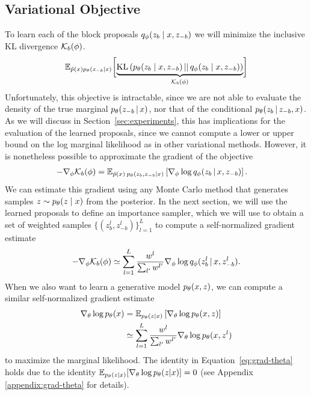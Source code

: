 \documentclass{article}
\theoremstyle{definition}
\begin{document}
\subsection{Variational Objective} 
To learn each of the block proposals $q_\phi(z_b \mid x, z_{-b})$ we will minimize the inclusive KL divergence $\mathcal{K}_b(\phi)$.
\begin{align*}
    \mathbb{E}_{\hat{p}(x)p_\theta(z_{-b} | x)}
    \biggl[
    \underbrace{
        \text{KL}\left(
            p_\theta(z_{b} \mid x, z_{-b})
            \,||\,
            q_\phi(z_{b} \mid x, z_{-b})
        \right)
    }_{\mathcal{K}_b(\phi)}
    \biggr]
\end{align*}
Unfortunately, this objective is intractable, since we are not able to evaluate the density of the true marginal $p_\theta(z_{-b} \,|\, x)$, nor that of the conditional $p_\theta(z_{b} \,|\, z_{-b}, x)$. As we will discuss in Section~\ref{sec:experiments}, this has implications for the evaluation of the learned proposals, since we cannot compute a lower or upper bound on the log marginal likelihood as in other variational methods. However, it is nonetheless possible to approximate the gradient of the objective 
\begin{align*}
    -\nabla_\phi \mathcal{K}_b(\phi)
    &=
    \mathbb{E}_{
    \hat{p}(x) \:
    p_\theta(z_{b}, z_{-b} | x)
    }
    \left[
    \nabla_\phi
    \log q_\phi(z_{b} \,|\, x, z_{-b})
    \right].
\end{align*}
We can estimate this gradient using any Monte Carlo method that generates samples $z \sim p_\theta(z \mid x)$ from the posterior. In the next section, we will use the learned proposals to define an importance sampler, which we will use to obtain a set of weighted samples $\{(z^l_b, z^l_{-b})\}_{l=1}^L$ to compute a self-normalized gradient estimate
\begin{align}
    \label{eq:grad-self-normalized}
    -\nabla_\phi \mathcal{K}_b(\phi)
    \simeq
    \sum_{l=1}^L
    \frac{w^l}{\sum_{l'} w^{l'}}
    \nabla_\phi
    \log q_\phi(z^l_{b} \,|\, x, z^l_{-b}).
\end{align}
When we also want to learn a generative model $p_\theta(x, z)$, we can compute a similar self-normalized gradient estimate 
\begin{align}
    \nabla_\theta \log p_\theta(x) 
    &=
    \mathbb{E}_{p_\theta(z | x)} 
    \left[
    \nabla_\theta \log p_\theta(x, z)
    \right] \label{eq:grad-theta}\\
    &
    \simeq
    \sum_{l=1}^L
    \frac{w^l}{\sum_{l'} w^{l'}}
    \nabla_\theta
    \log p_\theta(x, z^l)
    \nonumber
\end{align}
to maximize the marginal likelihood.
The identity in Equation~\ref{eq:grad-theta} holds due to the identity \mbox{$\mathbb{E}_{p_\theta(z|x)}[\nabla_\theta \log p_\theta(z|x)]=0$} (see Appendix \ref{appendix:grad-theta} for details). 
\end{document}
